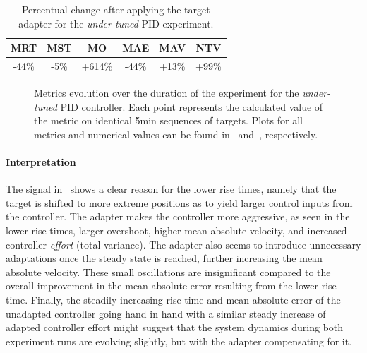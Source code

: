 \begin{table}
    \centering
    \caption{Percentual change after applying the target adapter for the \emph{under-tuned} PID experiment.}
    \label{tab:under-tuned-percent}
    \begin{tabular}{cccccc}
        \toprule
        MRT              & MST             & MO                & MAE              & MAV              & NTV              \\
        \midrule
        -44\si{\percent} & -5\si{\percent} & +614\si{\percent} & -44\si{\percent} & +13\si{\percent}  & +99\si{\percent}\\
        \bottomrule
    \end{tabular}
\end{table}

\begin{figure}
    \centering
    
    \vspace*{-2em}
    \caption{Metrics evolution over the duration of the experiment for the \emph{under-tuned} PID controller. Each point represents the calculated value of the metric on identical 5\si{\minute} sequences of targets. Plots for all metrics and numerical values can be found in~ and~, respectively.}
    \label{fig:under-tuned-metrics}
\end{figure}

\paragraph*{Interpretation}
The signal in~ shows a clear reason for the lower rise times, namely that the target is shifted to more extreme positions as to yield larger control inputs from the controller.
The adapter makes the controller more aggressive, as seen in the lower rise times, larger overshoot, higher mean absolute velocity, and increased controller \emph{effort} (total variance).
The adapter also seems to introduce unnecessary adaptations once the steady state is reached, further increasing the mean absolute velocity.
These small oscillations are insignificant compared to the overall improvement in the mean absolute error resulting from the lower rise time.
Finally, the steadily increasing rise time and mean absolute error of the unadapted controller going hand in hand with a similar steady increase of adapted controller effort might suggest that the system dynamics during both experiment runs are evolving slightly, but with the adapter compensating for it.


